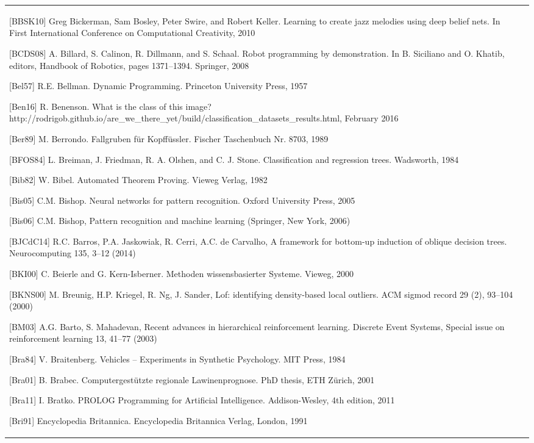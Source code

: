 \documentclass[10pt]{book}
\begin{document}
\begin{center}
\begin{tabular}{|l|l|}
[BBSK10] Greg Bickerman, Sam Bosley, Peter Swire, and Robert Keller. Learning to create jazz melodies using deep belief nets. In First International Conference on Computational Creativity, 2010

[BCDS08] A. Billard, S. Calinon, R. Dillmann, and S. Schaal. Robot programming by demonstration. In B. Siciliano and O. Khatib, editors, Handbook of Robotics, pages 1371–1394. Springer, 2008

[Bel57] R.E. Bellman. Dynamic Programming. Princeton University Press, 1957

[Ben16] R. Benenson. What is the class of this image? http://rodrigob.github.io/are\_we\_there\_yet/build/classification\_datasets\_results.html, February 2016

[Ber89] M. Berrondo. Fallgruben für Kopffüssler. Fischer Taschenbuch Nr. 8703, 1989

[BFOS84] L. Breiman, J. Friedman, R. A. Olshen, and C. J. Stone. Classification and regression trees. Wadsworth, 1984

[Bib82] W. Bibel. Automated Theorem Proving. Vieweg Verlag, 1982

[Bis05] C.M. Bishop. Neural networks for pattern recognition. Oxford University Press, 2005

[Bis06] C.M. Bishop, Pattern recognition and machine learning (Springer, New York, 2006)

[BJCdC14] R.C. Barros, P.A. Jaskowiak, R. Cerri, A.C. de Carvalho, A framework for bottom-up induction of oblique decision trees. Neurocomputing 135, 3–12 (2014)

[BKI00] C. Beierle and G. Kern-Isberner. Methoden wissensbasierter Systeme. Vieweg, 2000

[BKNS00] M. Breunig, H.P. Kriegel, R. Ng, J. Sander, Lof: identifying density-based local outliers. ACM sigmod record 29 (2), 93–104 (2000)

[BM03] A.G. Barto, S. Mahadevan, Recent advances in hierarchical reinforcement learning. Discrete Event Systems, Special issue on reinforcement learning 13, 41–77 (2003)

[Bra84] V. Braitenberg. Vehicles – Experiments in Synthetic Psychology. MIT Press, 1984

[Bra01] B. Brabec. Computergestützte regionale Lawinenprognose. PhD thesis, ETH Zürich, 2001

[Bra11] I. Bratko. PROLOG Programming for Artificial Intelligence. Addison-Wesley, 4th edition, 2011

[Bri91] Encyclopedia Britannica. Encyclopedia Britannica Verlag, London, 1991


\end{tabular}
\end{center}
\end{document}
